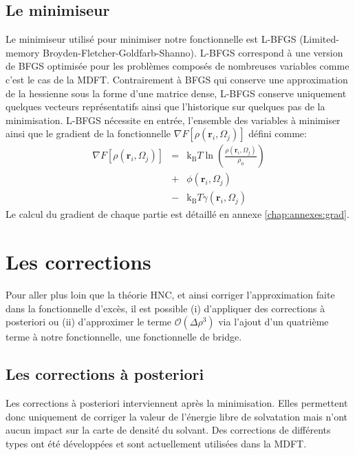 \subsection{Le minimiseur}
Le minimiseur utilisé pour minimiser notre fonctionnelle est L-BFGS (Limited-memory Broyden-Fletcher-Goldfarb-Shanno)\cite{Byrd_lbfgs_1995}. L-BFGS correspond à une version de BFGS\cite{bfgs_2006} optimisée pour les problèmes composés de nombreuses variables comme c'est le cas de la MDFT. Contrairement à BFGS qui conserve une approximation de la hessienne sous la forme d'une matrice dense, L-BFGS conserve uniquement quelques vecteurs représentatifs ainsi que l'historique sur quelques pas de la minimisation. L-BFGS nécessite en entrée, l'ensemble des variables à minimiser ainsi que le gradient de la fonctionnelle $\nabla F[\rho\left(\boldsymbol{r}_i,\Omega_j\right)]$ défini comme:
\begin{eqnarray}
\nabla F[\rho(\boldsymbol{r}_i,\Omega_j)] &=& \mathrm{k_B}T \ln(\frac{\rho(\boldsymbol{r}_i,\Omega_j)}{\rho_0}) \\
&+& \phi(\boldsymbol{r}_i,\Omega_j) \nonumber \\
&-& \mathrm{k_B}T \gamma(\boldsymbol{r}_i,\Omega_j) \nonumber
\end{eqnarray}
Le calcul du gradient de chaque partie est détaillé en annexe \ref{chap:annexes:grad}.

\section{Les corrections}
Pour aller plus loin que la théorie HNC, et ainsi corriger l'approximation faite dans la fonctionnelle d'excès, il est possible (i) d'appliquer des corrections à posteriori ou (ii) d'approximer le terme $\mathcal{O}(\Delta\rho^{3})$ via l'ajout d'un quatrième terme à notre fonctionnelle, une fonctionnelle de bridge.


\subsection{Les corrections à posteriori}
Les corrections à posteriori interviennent après la minimisation. Elles permettent donc uniquement de corriger la valeur de l'énergie libre de solvatation mais n'ont aucun impact sur la carte de densité du solvant. Des corrections de différents types ont été développées et sont actuellement utilisées dans la MDFT.


